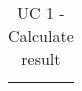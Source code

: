 \documentclass{article}
\begin{document}
\begin{table}[!h]
\begin{tabular}{|p{3cm}|p{9cm}|}
\begin{itemize}[leftmargin=6mm]
		\vspace{-3.5mm}
	\end{itemize}  \\ \hline
\end{tabular}
\caption{UC 1 - Calculate result}
\end{table}
\end{document}
